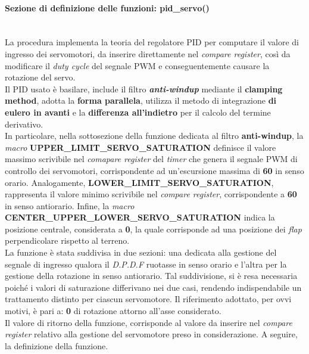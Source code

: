 \paragraph{Sezione di definizione delle funzioni: pid\_servo()}\mbox{}\\
La procedura implementa la teoria del regolatore PID per computare il valore di ingresso dei servomotori, da inserire direttamente nel \textit{compare register}, così da modificare il \textit{duty cycle} del segnale
PWM e conseguentemente causare la rotazione del servo.\\
Il PID usato è basilare, include il filtro \textit{\textbf{anti-windup}} mediante il \textbf{clamping method}, adotta la \textbf{forma parallela}, utilizza il metodo di integrazione \textbf{di eulero in avanti} e la \textbf{differenza all'indietro} per il calcolo del termine derivativo.\\
In particolare, nella sottosezione della funzione dedicata al filtro \textbf{anti-windup}, la \textit{macro} \textbf{UPPER\_LIMIT\_SERVO\_SATURATION} definisce il valore massimo scrivibile nel \textit{comapare register} del \textit{timer} che genera il segnale PWM di controllo dei servomotori,
corrispondente ad un'escursione massima di \textbf{60\degree} in senso orario. Analogamente, \textbf{LOWER\_LIMIT\_SERVO\_SATURATION}, rappresenta il valore minimo scrivibile nel \textit{compare register}, corrispondente a \textbf{60\degree} in senso antiorario.
Infine, la \textit{macro} \textbf{CENTER\_UPPER\_LOWER\_SERVO\_SATURATION} indica la posizione centrale, considerata a \textbf{0\degree}, la quale corrisponde ad una posizione dei \textit{flap} perpendicolare rispetto al terreno.\\
La funzione è stata suddivisa in due sezioni: una dedicata alla gestione del segnale di ingresso qualora il \textit{D.P.D.F} ruotasse in senso orario e l'altra per la gestione della rotazione in senso antiorario. Tal suddivisione, si è resa necessaria
poiché i valori di saturazione differivano nei due casi, rendendo indispendabile un trattamento distinto per ciascun servomotore.
Il riferimento adottato, per ovvi motivi, è pari a: \textbf{0\degree} di rotazione attorno all'asse considerato.\\
Il valore di ritorno della funzione, corrisponde al valore da inserire nel \textit{compare register} relativo alla gestione del servomotore preso in considerazione.
A seguire, la definizione della funzione.


